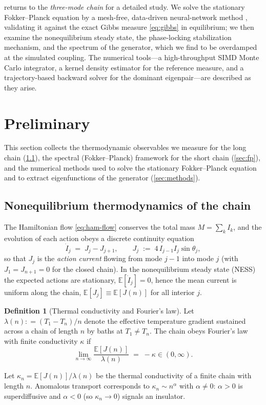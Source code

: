 \documentclass[11pt,a4paper]{article}
\theoremstyle{definition}
\newtheorem{definition}[theorem]{Definition}
\newcommand{\E}{\mathbb{E}}
\numberwithin{equation}{section}   %
\begin{document}
 returns to the \emph{three-mode chain} for a detailed
study. We solve the stationary Fokker--Planck equation by a mesh-free,
data-driven neural-network method \cite{ZhaiDobsonLi}, validating it against the
exact Gibbs measure \eqref{eq:gibbs} in equilibrium; we then examine the
nonequilibrium steady state, the phase-locking stabilization mechanism, and the
spectrum of the generator, which we find to be overdamped at the simulated
coupling. The numerical tools---a high-throughput SIMD Monte Carlo integrator, a
kernel density estimator for the reference measure, and a trajectory-based
backward solver for the dominant eigenpair---are described as they arise.


\section{Preliminary}

This section collects the thermodynamic observables we measure for the long
chain (\cref{sec:thermo}), the spectral (Fokker--Planck) framework for the
short chain (\cref{sec:fp}), and the numerical methods used to solve the
stationary Fokker--Planck equation and to extract eigenfunctions of the
generator (\cref{sec:methods}).

\subsection{Nonequilibrium thermodynamics of the chain}\label{sec:thermo}

The Hamiltonian flow \eqref{eq:ham-flow} conserves the total mass
$M=\sum_k I_k$, and the evolution of each action obeys a discrete continuity
equation
\begin{equation}\label{eq:continuity}
  \dot I_j \;=\; J_j - J_{j+1},
  \qquad
  J_j \;:=\; 4\, I_{j-1} I_j \sin\theta_j ,
\end{equation}
so that $J_j$ is the \emph{action current} flowing from mode $j-1$ into mode
$j$ (with $J_1=J_{n+1}=0$ for the closed chain). In the nonequilibrium steady
state (NESS) the expected actions are stationary, $\E[\dot I_j]=0$, hence the
mean current is uniform along the chain, $\E[J_j]\equiv \E[J(n)]$ for all interior
$j$.

\begin{definition}[Thermal conductivity and Fourier's law]\label{de:fourier}
Let $\lambda(n) : = (T_1 - T_n)/n$ denote the effective temperature gradient sustained across a
chain of length $n$ by baths at $T_1\neq T_n$. The chain obeys Fourier's law
with finite conductivity $\kappa$ if
\begin{equation}\label{eq:fourier}
  \lim_{n \rightarrow \infty}\frac{\E[J(n)]}{\lambda(n)} \;=\; -
  \kappa \in (0,\infty).
\end{equation}

Let $\kappa_n = \E[J(n)]/\lambda(n)$ be the thermal conductivity of a finite chain with length $n$. Anomalous transport corresponds to $\kappa_n\sim n^{\alpha}$ with $\alpha\neq0$:
$\alpha>0$ is superdiffusive and $\alpha<0$ (so $\kappa_n\to0$) signals an
insulator.
\end{definition}
\end{document}
